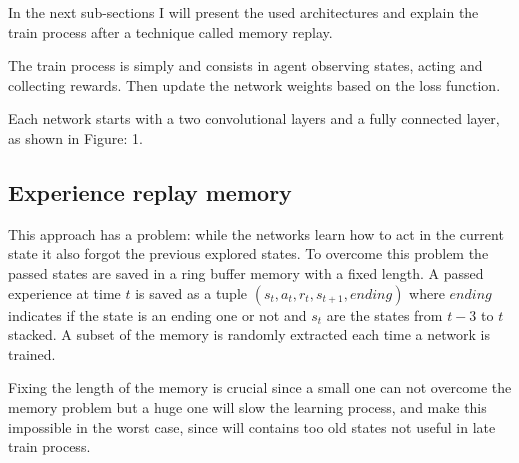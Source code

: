 \documentclass[10pt]{article}
\begin{document}
\begin{multicols}{2}
In the next sub-sections I will present the used architectures and explain the train process after a technique called memory replay. 

The train process is simply and consists in agent observing states, acting and collecting rewards. Then update the network weights based on the loss function. 


Each network starts with a two convolutional layers and a fully connected layer, as shown in Figure: 1.
 
\subsection{Experience replay memory}
This approach has a problem: while the networks learn how to act in the current state it also forgot the previous explored states. To overcome this problem the passed states are saved in a ring buffer memory with a fixed length. A passed experience at time $t$ is saved as a tuple $(s_t, a_t, r_t, s_{t+1}, ending)$ where $ending$ indicates if the state is an ending one or not and $s_t$ are the states from $t-3$ to $t$ stacked. A subset of the memory is randomly extracted each time a network is trained. 

Fixing the length of the memory is crucial since a small one can not overcome the memory problem but a huge one will slow the learning process, and make this impossible in the worst case, since will contains too old states not useful in late train process.


\end{multicols}
\end{document}

